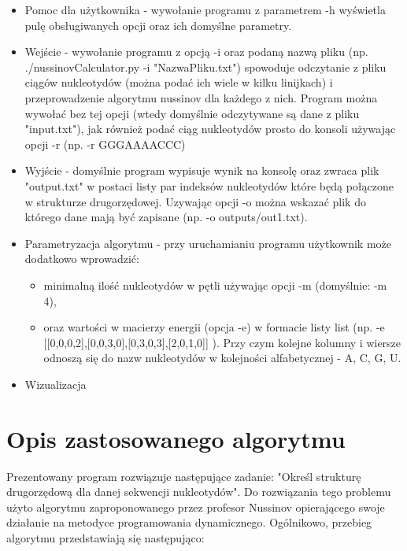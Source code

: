 \documentclass[paper=a4, fontsize=11pt]{scrartcl} %
\numberwithin{equation}{section} %
\numberwithin{figure}{section} %
\numberwithin{table}{section} %
\begin{document}
\begin{itemize}
	\item Pomoc dla użytkownika - wywołanie programu z parametrem -h wyświetla pulę obsługiwanych opcji oraz ich domyślne parametry.
	\item Wejście - wywołanie programu z opcją -i oraz podaną nazwą pliku (np. ./nussinovCalculator.py -i "NazwaPliku.txt") spowoduje odczytanie z pliku ciągów nukleotydów (można podać ich wiele w kilku linijkach) i przeprowadzenie algorytmu nussinov dla każdego z nich. Program można wywołać bez tej opcji (wtedy domyślnie odczytywane są dane z pliku "input.txt"), jak również podać ciąg nukleotydów prosto do konsoli używając opcji \mbox{-r} (np. \mbox{-r} GGGAAAACCC)
	\item Wyjście - domyślnie program wypisuje wynik na konsolę oraz zwraca plik "output.txt" w postaci listy par indeksów nukleotydów które będą połączone w strukturze drugorzędowej. Uzywając opcji -o można wskazać plik do którego dane mają być zapisane (np. -o outputs/out1.txt).
	\item Parametryzacja algorytmu - przy uruchamianiu programu użytkownik może dodatkowo wprowadzić:
		\begin{itemize}
			\item minimalną ilość nukleotydów w pętli używając opcji \mbox{-m} (domyślnie: \mbox{-m} 4),
			\item oraz wartości w macierzy energii (opcja -e) w formacie listy list (np. \mbox{-e} [[0,0,0,2],[0,0,3,0],[0,3,0,3],[2,0,1,0]] ). Przy czym kolejne kolumny i wiersze odnoszą się do nazw nukleotydów w kolejności alfabetycznej - A, C, G, U.
		\end{itemize}
	
	\item Wizualizacja
	
	
	
	



\end{itemize}



\section{Opis zastosowanego algorytmu}

Prezentowany program rozwiązuje następujące zadanie: "Określ strukturę drugorzędową dla danej sekwencji nukleotydów". Do rozwiązania tego problemu użyto algorytmu zaproponowanego przez profesor Nussinov \cite{bib:nuss1}\cite{bib:nuss2} opierającego swoje działanie na metodyce programowania dynamicznego. Ogólnikowo, przebieg algorytmu przedstawiają się następująco:
\end{document}
